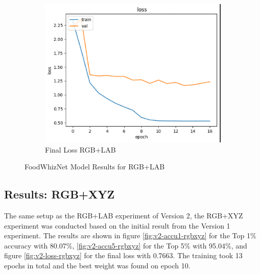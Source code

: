 \begin{figure}[htbp]
  \medskip
  \begin{subfigure}[b]{0.45\textwidth}
    \includegraphics[width=\textwidth]{graphics/images/results/v2-loss.png}
    \caption{Final Loss RGB+LAB}
    \label{fig:v2-loss}
  \end{subfigure}
  \caption{FoodWhizNet Model Results for RGB+LAB}
  \label{fig:fwnresults}
\end{figure}

\subsection{Results: RGB+XYZ}
The same setup as the RGB+LAB experiment of Version 2, the RGB+XYZ experiment was conducted based on the initial result from the Version 1 experiment. The results are shown in figure \ref{fig:v2-accu1-rgbxyz} for the Top 1\% accuracy with 80.07\%, \ref{fig:v2-accu5-rgbxyz} for the Top 5\% with 95.04\%, and figure \ref{fig:v2-loss-rgbxyz} for the final loss with 0.7663. The training took 13 epochs in total and the best weight was found on epoch 10.

